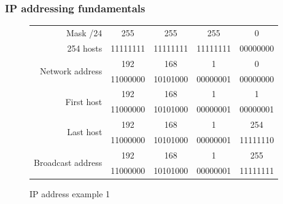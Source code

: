   \begin{frame}
    \frametitle{IP addressing fundamentals}
    \begin{figure}
        \centering
      \begin{tabular}{|r|cccc|}
        \hline
        Mask {\color{brown}/24} & {\color{brown}255} & {\color{brown}255} & {\color{brown}255} & {\color{fuchsia}0} \\
        254 {\color{blue}hosts}& {\color{brown}11111111} & {\color{brown}11111111} & {\color{brown}11111111} & {\color{fuchsia}00000000} \\ \hline
        \multirow{2}{*}{Network address} & \color{ForestGreen}192 & \color{ForestGreen}168 & \color{ForestGreen}1 & \color{blue}0 \\
        & \color{ForestGreen}11000000 & \color{ForestGreen}10101000 & \color{ForestGreen}00000001 & \color{blue}00000000 \\ \hline
        \multirow{2}{*}{First host} & \color{ForestGreen}192 & \color{ForestGreen}168 & \color{ForestGreen}1 & \color{blue}1 \\
        & \color{ForestGreen}11000000 & \color{ForestGreen}10101000 & \color{ForestGreen}00000001 & \color{blue}00000001 \\ \hline
        \multirow{2}{*}{Last host} & \color{ForestGreen}192 & \color{ForestGreen}168 & \color{ForestGreen}1 & \color{blue}254 \\
        & \color{ForestGreen}11000000 & \color{ForestGreen}10101000 & \color{ForestGreen}00000001 & \color{blue}11111110 \\ \hline
        \multirow{2}{*}{Broadcast address} & \color{ForestGreen}192 & \color{ForestGreen}168 & \color{ForestGreen}1 & \color{blue}255 \\
        & \color{ForestGreen}11000000 & \color{ForestGreen}10101000 & \color{ForestGreen}00000001 & \color{blue}11111111 \\ \hline
      \end{tabular}
      \caption{IP address example 1}
    \end{figure}
  \end{frame}

